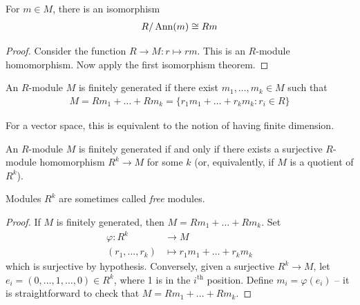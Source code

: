 \documentclass{../template/note}
\begin{document}
    \begin{proposition}
        For $m \in M$, there is an isomorphism
        \begin{align*}
            R/\operatorname{Ann}(m) \cong Rm
        \end{align*}
    \end{proposition}
    
    \begin{proof}
        Consider the function $R \to M: r \mapsto rm$. This is an $R$-module homomorphism. Now apply the first isomorphism theorem.
    \end{proof}
    
    \begin{definition}
        An $R$-module $M$ is finitely generated if there exist $m_1, \dots, m_k \in M$ such that
        \begin{align*}
            M = Rm_1 + \dots + Rm_k = \{r_1m_1 + \dots + r_km_k: r_i \in R\}
        \end{align*}
    \end{definition}
    
    \begin{remark*}
        For a vector space, this is equivalent to the notion of having finite dimension.
    \end{remark*}
    
    \begin{lemma}
        An $R$-module $M$ is finitely generated if and only if there exists a surjective $R$-module homomorphism $R^k \to M$ for some $k$ (or, equivalently, if $M$ is a quotient of $R^k$).
    \end{lemma}

    \begin{remark*}
        Modules $R^k$ are sometimes called \emph{free} modules.
    \end{remark*}
    
    \begin{proof}
        If $M$ is finitely generated, then $M = Rm_1 + \dots + Rm_k$. Set
        \begin{align*}
            \varphi: R^k &\to M \\
            (r_1, \dots, r_k) &\mapsto r_1m_1 + \dots + r_km_k
        \end{align*}
        which is surjective by hypothesis. Conversely, given a surjective $R^k \to M$, let $e_i = (0, \dots, 1, \dots, 0) \in R^k$, where 1 is in the $i^\text{th}$ position. Define $m_i = \varphi(e_i)$ -- it is straightforward to check that $M = Rm_1 + \dots + Rm_k$.        
    \end{proof}
    
\end{document}
